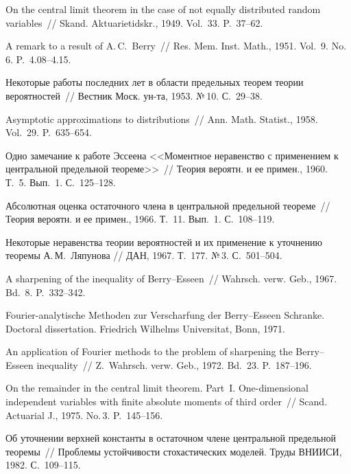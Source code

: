 \begin{multicols}{2}
{{\begin{thebibliography}{99}
 On the central limit theorem in the case of
not equally distributed random variables~// Skand. Aktuarietidskr.,
1949. Vol.~33. P.~37--62.

 A remark to a result of A.\,C.~Berry~// Res. Mem.
Inst. Math., 1951. Vol.~9. No.\,6. P.~4.08--4.15.

 Некоторые работы последних лет в области
предельных теорем теории вероятностей~// Вестник Моск. ун-та, 1953.
№\,10. С.~29--38.

 Asymptotic approximations to distributions~//
Ann. Math. Statist., 1958. Vol.~29. P.~635--654.

 Одно замечание к работе Эссеена <<Моментное
неравенство с применением к центральной предельной теореме>>~//
Теория вероятн. и ее примен., 1960. Т.~5. Вып.~1. С.~125--128.

Абсолютная оценка остаточного члена в центральной предельной теореме~// Теория вероятн. и ее примен.,
1966. Т.~11. Вып.~1. С.~108--119.

 Некоторые неравенства теории вероятностей и их
применение к уточнению теоремы А.\,М.~Ляпунова // ДАН, 1967.
Т.~177. №\,3. С.~501--504.

 A sharpening of the inequality of
Berry--Esseen~// Wahrsch. verw. Geb., 1967. Bd.~8. P.~332--342.

Fourier-analytische Methoden zur Verscharfung der
Berry--Esseen Schranke. Doctoral dissertation. Friedrich Wilhelms
Universitat, Bonn, 1971.

 An application of Fourier methods to the problem
of sharpening the Berry--Esseen inequality~// Z.~Wahrsch. verw.
Geb., 1972. Bd.~23. P.~187--196.

 On the remainder in the central limit theorem. Part~I.
One-dimensional independent variables with finite absolute moments of third order~//
Scand. Actuarial J., 1975. No.\,3. P.~145--156.

 Об уточнении верхней константы в остаточном
члене центральной предельной теоремы~// Проблемы устойчивости
стохастических моделей. Труды ВНИИСИ, 1982. С.~109--115.


\end{thebibliography}}}
\end{multicols}
